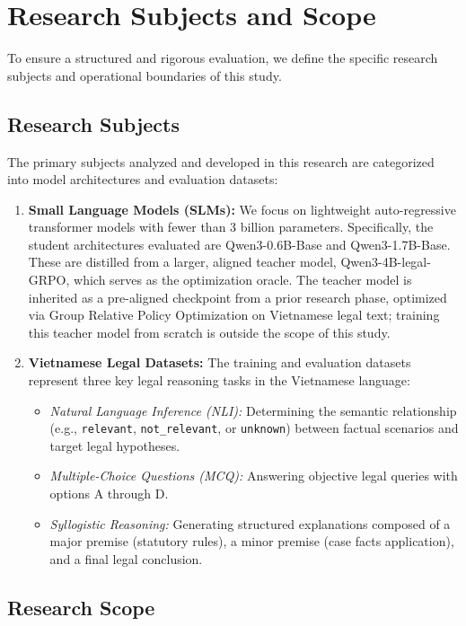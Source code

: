 \section{Research Subjects and Scope}

To ensure a structured and rigorous evaluation, we define the specific research subjects and operational boundaries of this study.

\subsection{Research Subjects}

The primary subjects analyzed and developed in this research are categorized into model architectures and evaluation datasets:
\begin{enumerate}
    \item \textbf{Small Language Models (SLMs):} We focus on lightweight auto-regressive transformer models with fewer than 3 billion parameters. Specifically, the student architectures evaluated are Qwen3-0.6B-Base and Qwen3-1.7B-Base. These are distilled from a larger, aligned teacher model, Qwen3-4B-legal-GRPO, which serves as the optimization oracle. The teacher model is inherited as a pre-aligned checkpoint from a prior research phase, optimized via Group Relative Policy Optimization on Vietnamese legal text; training this teacher model from scratch is outside the scope of this study.
    \item \textbf{Vietnamese Legal Datasets:} The training and evaluation datasets represent three key legal reasoning tasks in the Vietnamese language:
    \begin{itemize}
        \item \textit{Natural Language Inference (NLI):} Determining the semantic relationship (e.g., \texttt{relevant}, \texttt{not\_relevant}, or \texttt{unknown}) between factual scenarios and target legal hypotheses.
        \item \textit{Multiple-Choice Questions (MCQ):} Answering objective legal queries with options A through D.
        \item \textit{Syllogistic Reasoning:} Generating structured explanations composed of a major premise (statutory rules), a minor premise (case facts application), and a final legal conclusion.
    \end{itemize}
\end{enumerate}

\subsection{Research Scope}

